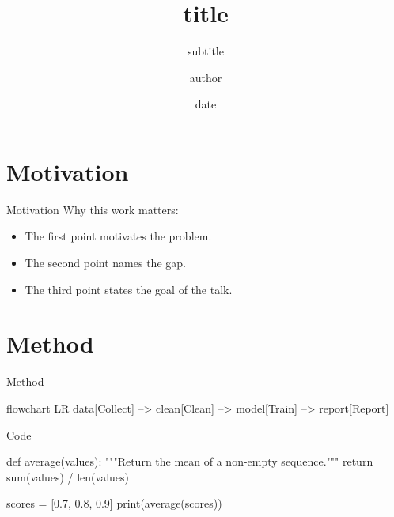 \documentclass[aspectratio=169,14pt]{beamer}
\title[Short title]{{{title}}}
\subtitle{{{subtitle}}}
\author[{{author}}]{{{author}}}
\institute[{{institution}}]{{{institution}}}
\date{{{date}}}
\begin{document}
  \begin{frame}
    \titlepage
  \end{frame}

  \begin{frame}{\contentsname}
    \tableofcontents
  \end{frame}

  \section{Motivation}

  \begin{frame}{Motivation}
    Why this work matters:
    \begin{itemize}
      \item The first point motivates the problem.
      \pause
      \item The second point names the gap.
      \pause
      \item The third point states the goal of the talk.
    \end{itemize}
  \end{frame}

  \section{Method}

  \begin{frame}{Method}
    \begin{mermaid}[style=editorial, caption={Sample pipeline from data to result}, width=0.8\linewidth]
      flowchart LR
      data[Collect] --> clean[Clean] --> model[Train] --> report[Report]
    \end{mermaid}
  \end{frame}

  \begin{frame}[fragile]{Code}
    \begin{code}[lang=python]
def average(values):
    """Return the mean of a non-empty sequence."""
    return sum(values) / len(values)

scores = [0.7, 0.8, 0.9]
print(average(scores))
    \end{code}
  \end{frame}
\end{document}
